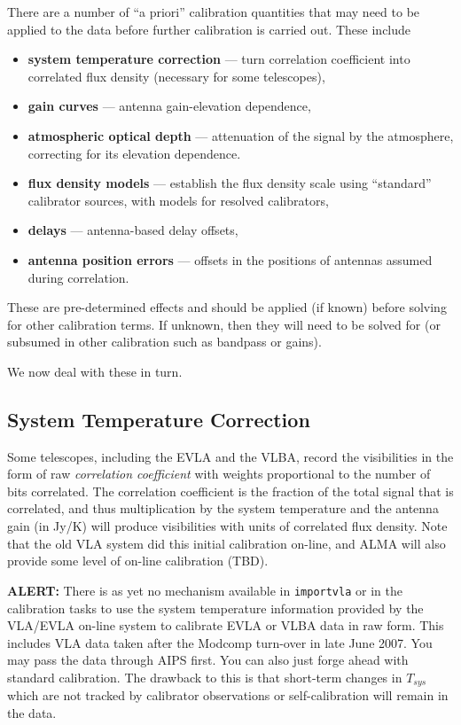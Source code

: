 There are a number of ``a priori'' calibration quantities that
may need to be applied to the data before further calibration
is carried out.  These include
\begin{itemize}
   \item {\bf system temperature correction} --- turn correlation
      coefficient into correlated flux density (necessary for some
      telescopes),
   \item {\bf gain curves} --- antenna gain-elevation dependence,
   \item {\bf atmospheric optical depth} --- attenuation of the signal
      by the atmosphere, correcting for its elevation dependence.
   \item {\bf flux density models} --- establish the flux density
      scale using ``standard'' calibrator sources, with models for
      resolved calibrators,
   \item {\bf delays} --- antenna-based delay offsets,
   \item {\bf antenna position errors} --- offsets in the positions of
      antennas assumed during correlation.
\end{itemize}
These are pre-determined effects and should be applied (if known) before
solving for other calibration terms.  If unknown, then they will
need to be solved for (or subsumed in other calibration such as 
bandpass or gains).

We now deal with these in turn.

\subsection{System Temperature Correction}
\label{section:cal.prior.tsys}

Some telescopes, including the EVLA and the VLBA, record the
visibilities in the form of raw {\it correlation coefficient} 
with weights proportional to the number of bits correlated.
The correlation coefficient is the fraction of the total signal
that is correlated, and thus multiplication by the system temperature
and the antenna gain (in Jy/K) will produce visibilities with
units of correlated flux density.  Note that the old VLA system did
this initial calibration on-line, and ALMA will also provide some
level of on-line calibration (TBD).

{\bf ALERT:} There is as yet no mechanism available in {\tt importvla}
or in the calibration tasks to use the system temperature information
provided by the VLA/EVLA on-line system to calibrate EVLA or VLBA data
in raw form.  This includes VLA data taken after the Modcomp turn-over
in late June 2007.  You may pass the data through AIPS first.  You can
also just forge ahead with standard calibration.  The drawback to this
is that short-term changes in $T_{sys}$ which are not tracked by
calibrator observations or self-calibration will remain in the data.

